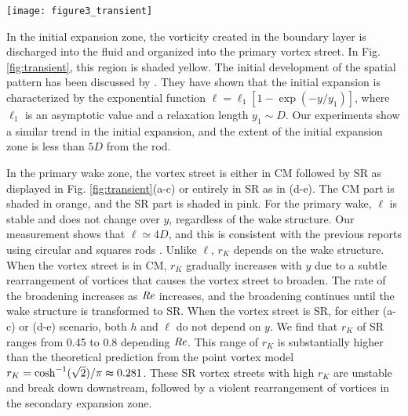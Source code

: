 \documentclass[english, aps, prl, longbibliography, preprint]{revtex4-1}
\newcommand\citebyname\citet
\newcommand\Reynolds{{\it Re}}
\begin{document}
\begin{figure*}
\begin{centering}
\texttt{[image: figure3\_transient]}
\par
\end{centering}
\caption{
The characterization of vortex structures.
The longitudinal spacing between vortices $\ell/D$ (closed squares) and the K\'{a}rm\'{a}n ratio $r_{K}$ (open circles) are measured with respect to the downstream distance $y/D$ for vortex streets behind the tapered triangular rod of $r_{a}=0.5$. 
A vortex street is separated into following stations: (i) the expansion zone (shaded yellow), (ii) primary wake in CM (shaded orange) or in SR (shaded pink), (iii) the second expansion zone (SR$\rightarrow$CM transition zone, shaded grey), and (iv) the secondary wake zone.
We notice that $\ell$ rapidly increases in the expansion zones and is stable and unchanged in the wake zones, and its final approach is characterized as the exponential expansion in Eq. (\ref{eq:exponential_expansion}), as indicated by blue dotted lines. 
Unlike $\ell$, K\'{a}rm\'{a}n ratio $r_{K}$ is gradually increasing when the vortex street is in CM.
\label{fig:transient}}
\end{figure*}

In the initial expansion zone, the vorticity created in the boundary layer is discharged into the fluid and organized into the primary vortex street.
In Fig. \ref{fig:transient}, this region is shaded yellow.
The initial development of the spatial pattern has been discussed by \citebyname{Kim:2015jp}.
They have shown that the initial expansion is characterized by the exponential function $\ell =\ell_1[1-\exp(-y/y_1)]$, where $\ell_1$ is an asymptotic value and a relaxation length $y_1\sim D$.
Our experiments show a similar trend in the initial expansion, and the extent of the initial expansion zone is less than $5D$ from the rod.

In the primary wake zone, the vortex street is either in CM followed by SR as displayed in Fig. \ref{fig:transient}(a-c) or entirely in SR as in (d-e).
The CM part is shaded in orange, and the SR part is shaded in pink.
For the primary wake, $\ell$ is stable and does not change over $y$, regardless of the wake structure.
Our measurement shows that $\ell\simeq 4D$, and this is consistent with the previous reports using circular and squares rods \citep{Roushan:2005un,Kim:2015jp}.
Unlike $\ell$, $r_K$ depends on the wake structure.
When the vortex street is in CM, $r_K$ gradually increases with $y$ due to a subtle rearrangement of vortices that causes the vortex street to broaden.
The rate of the broadening increases as $\Reynolds$ increases, and the broadening continues until the wake structure is transformed to SR.
When the vortex street is SR, for either (a-c) or (d-e) scenario, both $h$ and $\ell$ do not depend on $y$.
We find that $r_K$ of SR ranges from 0.45 to 0.8 depending $\Reynolds$.
This range of $r_K$ is substantially higher than the theoretical prediction from the point vortex model $r_K=\cosh^{-1}(\sqrt{2})/\pi\thickapprox0.281$.
These SR vortex streets with high $r_K$ are unstable and break down downstream, followed by a violent rearrangement of vortices in the secondary expansion zone.
\end{document}
